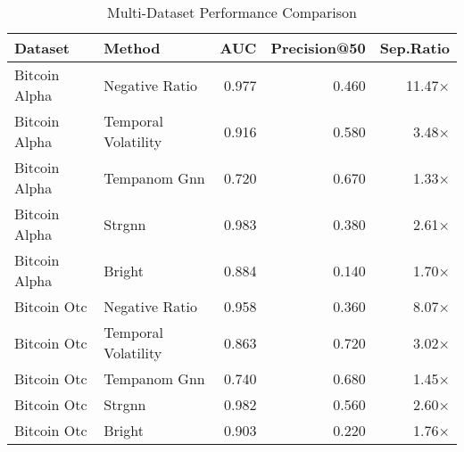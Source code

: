 
\begin{table}[h]
\centering
\caption{Multi-Dataset Performance Comparison}
\label{tab:multi_dataset_comparison}
\begin{tabular}{llrrr}
\toprule
Dataset & Method & AUC & Precision@50 & Sep.Ratio \\
\midrule
Bitcoin Alpha & Negative Ratio & 0.977 & 0.460 & 11.47× \\
Bitcoin Alpha & Temporal Volatility & 0.916 & 0.580 & 3.48× \\
Bitcoin Alpha & Tempanom Gnn & 0.720 & 0.670 & 1.33× \\
Bitcoin Alpha & Strgnn & 0.983 & 0.380 & 2.61× \\
Bitcoin Alpha & Bright & 0.884 & 0.140 & 1.70× \\
Bitcoin Otc & Negative Ratio & 0.958 & 0.360 & 8.07× \\
Bitcoin Otc & Temporal Volatility & 0.863 & 0.720 & 3.02× \\
Bitcoin Otc & Tempanom Gnn & 0.740 & 0.680 & 1.45× \\
Bitcoin Otc & Strgnn & 0.982 & 0.560 & 2.60× \\
Bitcoin Otc & Bright & 0.903 & 0.220 & 1.76× \\
\bottomrule
\end{tabular}
\end{table}
